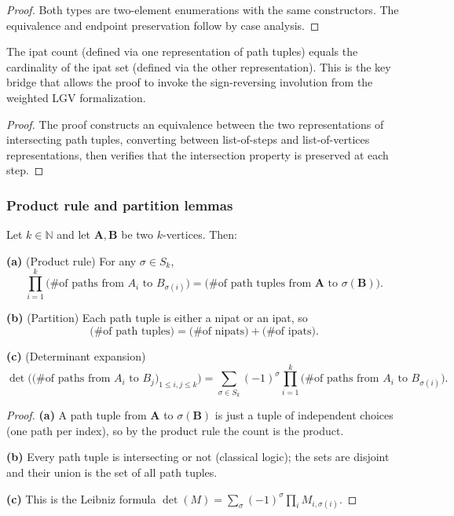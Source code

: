\begin{proof}
\leanok
Both types are two-element enumerations with the same constructors.
The equivalence and endpoint preservation follow by case analysis.
\end{proof}

\begin{lemma}
\label{lem.lgv.numipats-eq-ipatfinset}
\leanhelper
\leanok
The ipat count (defined via one representation of path tuples)
equals the cardinality of the ipat set (defined via the other representation).
This is the key bridge that allows the proof to invoke the sign-reversing
involution from the weighted LGV formalization.
\end{lemma}

\begin{proof}
The proof constructs an equivalence between the two representations of
intersecting path tuples, converting between list-of-steps and
list-of-vertices representations,
then verifies that the intersection property is preserved at each step.
\end{proof}

\subsubsection{Product rule and partition lemmas}

\begin{lemma}
\label{lem.lgv.kpaths.partition}
Let $k \in \mathbb{N}$ and let $\mathbf{A}, \mathbf{B}$ be two
$k$-vertices. Then:

\textbf{(a)} (Product rule) For any $\sigma \in S_k$,
\[
  \prod_{i=1}^k \bigl(\text{\# of paths from } A_i \text{ to }
  B_{\sigma(i)}\bigr) = \bigl(\text{\# of path tuples from }
  \mathbf{A} \text{ to } \sigma(\mathbf{B})\bigr).
\]

\textbf{(b)} (Partition) Each path tuple is either a nipat or an ipat,
so
\[
  \bigl(\text{\# of path tuples}\bigr) = \bigl(\text{\# of nipats}\bigr)
  + \bigl(\text{\# of ipats}\bigr).
\]

\textbf{(c)} (Determinant expansion)
\[
  \det\bigl(\bigl(\text{\# of paths from } A_i \text{ to }
  B_j\bigr)_{1 \le i,j \le k}\bigr) = \sum_{\sigma \in S_k} (-1)^\sigma
  \prod_{i=1}^k \bigl(\text{\# of paths from } A_i \text{ to }
  B_{\sigma(i)}\bigr).
\]
\end{lemma}

\begin{proof}
\textbf{(a)} A path tuple from $\mathbf{A}$ to $\sigma(\mathbf{B})$ is
just a tuple of independent choices (one path per index), so by the
product rule the count is the product.

\textbf{(b)} Every path tuple is intersecting or not (classical logic);
the sets are disjoint and their union is the set of all path tuples.

\textbf{(c)} This is the Leibniz formula
$\det(M) = \sum_\sigma (-1)^\sigma \prod_i M_{i,\sigma(i)}$.
\end{proof}

